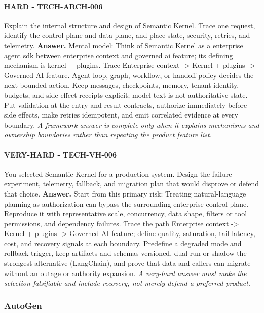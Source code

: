 \paragraph{HARD - TECH-ARCH-006} Explain the internal structure and design of Semantic Kernel. Trace one request, identify the control plane and data plane, and place state, security, retries, and telemetry.
\textbf{Answer.} Mental model: Think of Semantic Kernel as a enterprise agent sdk between enterprise context and governed ai feature; its defining mechanism is kernel + plugins. Trace Enterprise context -> Kernel + plugins -> Governed AI feature. Agent loop, graph, workflow, or handoff policy decides the next bounded action. Keep messages, checkpoints, memory, tenant identity, budgets, and side-effect receipts explicit; model text is not authoritative state. Put validation at the entry and result contracts, authorize immediately before side effects, make retries idempotent, and emit correlated evidence at every boundary.
\textit{A framework answer is complete only when it explains mechanisms and ownership boundaries rather than repeating the product feature list.}
\paragraph{VERY-HARD - TECH-VH-006} You selected Semantic Kernel for a production system. Design the failure experiment, telemetry, fallback, and migration plan that would disprove or defend that choice.
\textbf{Answer.} Start from this primary risk: Treating natural-language planning as authorization can bypass the surrounding enterprise control plane. Reproduce it with representative scale, concurrency, data shape, filters or tool permissions, and dependency failures. Trace the path Enterprise context -> Kernel + plugins -> Governed AI feature; define quality, saturation, tail-latency, cost, and recovery signals at each boundary. Predefine a degraded mode and rollback trigger, keep artifacts and schemas versioned, dual-run or shadow the strongest alternative (LangChain), and prove that data and callers can migrate without an outage or authority expansion.
\textit{A very-hard answer must make the selection falsifiable and include recovery, not merely defend a preferred product.}
\subsubsection*{AutoGen}
